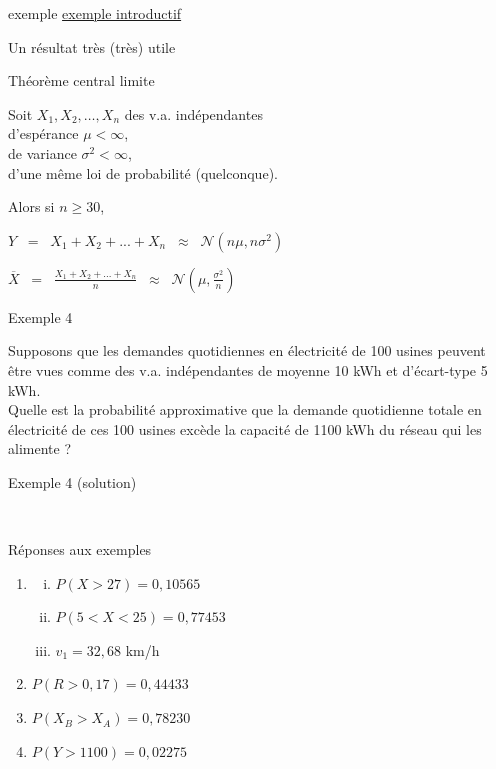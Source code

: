\documentclass{BeamerTemplate}
\begin{document}
\begin{frame}{exemple}
    \href{https://jmiron-introtcl.share.connect.posit.cloud/}{exemple introductif}
\end{frame}
\begin{frame}[t]{Un résultat très (très) utile}
\begin{Boite}{Théorème central limite}

Soit $X_1, X_2,\hdots, X_n$ des v.a. \alert{indépendantes}\\d'espérance $\mu<\infty$, \\de variance $\sigma^2<\infty$, \\ d'une même loi de probabilité (\alert{quelconque}).
\vspace{0.5cm}

Alors si $n\geq30$,
\vspace{0.5cm}

$Y\;\;=\;\;X_1+X_2+...+X_n\;\;\approx\;\; \mathcal{N}(n\mu, n\sigma^2)$

\vspace{0.5cm}

$\overline X\;\;=\;\;\displaystyle\frac{X_1+X_2+...+X_n}{n}\;\;\approx\;\; \mathcal{N}\left(\mu, \frac{\sigma^2}{n}\right)$

\end{Boite}
\end{frame}




\begin{frame}[t]{Exemple 4}

{\small
Supposons que les demandes quotidiennes en électricité de 100 usines peuvent être
vues comme des v.a. indépendantes de moyenne 10 kWh et
d'écart-type 5 kWh. \\

Quelle est la probabilité approximative que la demande quotidienne totale en électricité de ces 100 usines excède la capacité de 1100 kWh du réseau qui les alimente ?}\\

\end{frame}

\begin{frame}[t]{Exemple 4 (solution)}

{\ \ \ }
\end{frame}


\begin{frame}[t]{Réponses aux exemples}

\scriptsize
\begin{enumerate}
  \item     \begin{enumerate}[(i)]
            \item $P(X>27)=0,10565$
            \item $P(5<X<25)=0,77453$
            \item $v_1=32,68$ km/h
            \end{enumerate}
  \item $P(R>0,17)=0,44433$
  \item $P(X_B>X_A)=0,78230$
  \item $P(Y>1100)=0,02275$
 \end{enumerate}
\end{frame}
\end{document}
